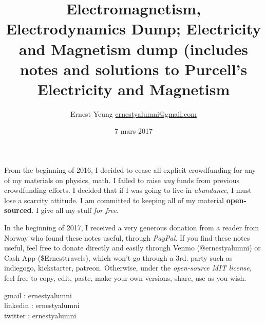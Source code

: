 \documentclass[10pt]{amsart}
\title{Electromagnetism, Electrodynamics Dump;  \large Electricity and Magnetism dump (includes notes and solutions to Purcell's Electricity and Magnetism}
\author{Ernest Yeung \href{mailto:ernestyalumni@gmail.com}{ernestyalumni@gmail.com}}
\date{7 mars 2017}
\begin{document}

\maketitle

From the beginning of 2016, I decided to cease all explicit crowdfunding for any of my materials on physics, math.  I failed to raise \emph{any} funds from previous crowdfunding efforts.  I decided that if I was going to live in \emph{abundance}, I must lose a scarcity attitude.  I am committed to keeping all of my material \textbf{open-sourced}.  I give all my stuff \emph{for free}.   

In the beginning of 2017, I received a very generous donation from a reader from Norway who found these notes useful, through \emph{PayPal}.  If you find these notes useful, feel free to donate directly and easily through Venmo (@ernestyalumni) or Cash App (\$Ernesttravels), which won't go through a 3rd. party such as indiegogo, kickstarter, patreon.  Otherwise, under the \emph{open-source MIT license}, feel free to copy, edit, paste, make your own versions, share, use as you wish.

\noindent gmail        : ernestyalumni \\
linkedin     : ernestyalumni \\
twitter      : ernestyalumni \\


  
\setcounter{tocdepth}{1}
\tableofcontents
\end{document}
